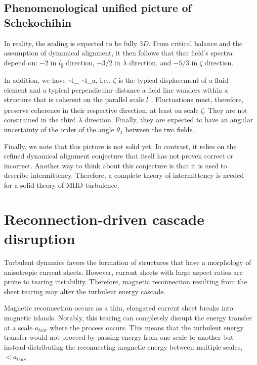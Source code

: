 \documentclass[usenatbib,twocolumn, twocolappendix]{aastex63}
\begin{document}
\subsection{Phenomenological unified picture of Schekochihin}

In reality, the scaling is expected to be fully $3D$.
From critical balance and the assumption of dynamical alignment, it then follows that that field's spectra depend on:
$-2$ in $l_\parallel$ direction,
$-3/2$ in $\lambda$ direction, and
$-5/3$ in $\zeta$ direction.

In addition, we have
\be
\zeta \sim l_\parallel {} \sim l_\parallel {}a,
\ee
i.e., $\zeta$ is the typical displacement of a fluid element and a typical perpendicular distance a field line wanders within a structure that is coherent on the parallel scale $l_\parallel$.
Fluctuations must, therefore, preserve coherence in their respective direction, at least on scale $\zeta$.
They are not constrained in the third $\lambda$ direction.
Finally, they are expected to have an angular uncertainty of the order of the angle $\theta_\lambda$ between the two fields.

Finally, we note that this picture is not solid yet.
In contrast, it relies on the refined dynamical alignment conjecture that itself has not proven correct or incorrect.
Another way to think about this conjecture is that it is used to describe intermittency.
Therefore, a complete theory of intermittency is needed for a solid theory of MHD turbulence.


\section{Reconnection-driven cascade disruption}

Turbulent dynamics favors the formation of structures that have a morphology of anisotropic current sheets.
However, current sheets with large aspect ratios are prone to tearing instability.
Therefore, magnetic reconnection resulting from the sheet tearing may alter the turbulent energy cascade.

Magnetic reconnection occurs as a thin, elongated current sheet breaks into magnetic islands.
Notably, this tearing can completely disrupt the energy transfer at a scale $a_{tear}$ where the process occurs.
This means that the turbulent energy transfer would not proceed by passing energy from one scale to another but instead distributing the reconnecting magnetic energy between multiple scales, $<a_{tear}$.
\end{document}
